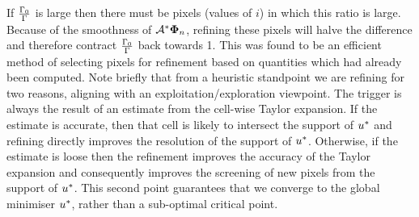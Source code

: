 \documentclass[10pt,a4paper,onecolumn]{article}
\numberwithin{equation}{section}
\renewcommand{\vec}{\mathbf}
\newcommand*{\varf}[1]{%
	\IfEqCase{#1}{%
		{0}{u}%
		{1}{v}%
		{2}{w}%
	}[u#1]%
}
\newcommand*{\vard}[1]{%
	\IfEqCase{#1}{%
		{0}{\varphi}%
		{1}{\psi}%
	}[\varphi #1]%
}
\newcommand*{\vars}[1]{%
	\IfEqCase{#1}{%
		{0}{\alpha}%
		{1}{\beta}%
		{2}{\gamma}%
		{3}{a}%
		{4}{b}%
		{5}{c}%
	}[k#1]%
}
\newcommand*{\data}[1]{%
	\IfEqCase{#1}{%
		{0}{\eta}%
		{1}{\nu}%
	}[g]%
}
\newcommand*{\vvard}[1]{\vec{\vard{#1}}}\newcommand*{\vdata}[1]{\vec{\data{#1}}}
\begin{document}
If $\frac{\vars2_0}{\vars2}$ is large then there must be pixels (values of $i$) in which this ratio is large. Because of the smoothness of $\A^*\vvard0_n$, refining these pixels will halve the difference and therefore contract $\frac{\vars2_0}{\vars2}$ back towards 1. This was found to be an efficient method of selecting pixels for refinement based on quantities which had already been computed. Note briefly that from a heuristic standpoint we are refining for two reasons, aligning with an exploitation/exploration viewpoint. The trigger is always the result of an estimate from the cell-wise Taylor expansion. If the estimate is accurate, then that cell is likely to intersect the support of $\varf0^*$ and refining directly improves the resolution of the support of $\varf0^*$. Otherwise, if the estimate is loose then the refinement improves the accuracy of the Taylor expansion and consequently improves the screening of new pixels from the support of $\varf0^*$. This second point guarantees that we converge to the global minimiser $\varf0^*$, rather than a sub-optimal critical point.
\end{document}
